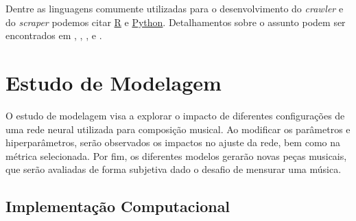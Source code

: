 \documentclass[twoside]{automatextcc}
\begin{document}
Dentre as linguagens comumente utilizadas para o desenvolvimento do \textit{crawler} e do \textit{scraper} podemos citar \href{https://cran.r-project.org}{R} e \href{https://python.org/}{Python}. Detalhamentos sobre o assunto podem ser encontrados em \citet{lawson2015}, \citet{sirisuriya2015}, \citet{patil2016}, \citet{farley2017} e \citet{khder2021}.



\chapter{Estudo de Modelagem}
O estudo de modelagem visa a explorar o impacto de diferentes configurações de uma rede neural utilizada para composição musical. Ao modificar os parâmetros e hiperparâmetros, serão observados os impactos no ajuste da rede, bem como na métrica selecionada. Por fim, os diferentes modelos gerarão novas peças musicais, que serão avaliadas de forma subjetiva dado o desafio de mensurar uma música.



\section{Implementação Computacional}
\label{computacional}
\end{document}
